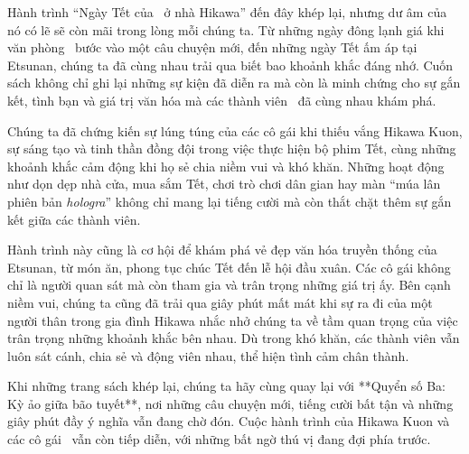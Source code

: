 \documentclass[main.tex]{subfiles}
\begin{document}
\color{black}
Hành trình ``Ngày Tết của \hll\ ở nhà Hikawa'' đến đây khép lại, nhưng dư âm của nó có lẽ sẽ còn mãi trong lòng mỗi chúng ta. Từ những ngày đông lạnh giá khi văn phòng \hll\ bước vào một câu chuyện mới, đến những ngày Tết ấm áp tại Etsunan, chúng ta đã cùng nhau trải qua biết bao khoảnh khắc đáng nhớ. Cuốn sách không chỉ ghi lại những sự kiện đã diễn ra mà còn là minh chứng cho sự gắn kết, tình bạn và giá trị văn hóa mà các thành viên \hll\ đã cùng nhau khám phá.

Chúng ta đã chứng kiến sự lúng túng của các cô gái khi thiếu vắng Hikawa Kuon, sự sáng tạo và tinh thần đồng đội trong việc thực hiện bộ phim Tết, cùng những khoảnh khắc cảm động khi họ sẻ chia niềm vui và khó khăn. Những hoạt động như dọn dẹp nhà cửa, mua sắm Tết, chơi trò chơi dân gian hay màn ``múa lân phiên bản \textit{hologra}'' không chỉ mang lại tiếng cười mà còn thắt chặt thêm sự gắn kết giữa các thành viên.

Hành trình này cũng là cơ hội để khám phá vẻ đẹp văn hóa truyền thống của Etsunan, từ món ăn, phong tục chúc Tết đến lễ hội đầu xuân. Các cô gái không chỉ là người quan sát mà còn tham gia và trân trọng những giá trị ấy. Bên cạnh niềm vui, chúng ta cũng đã trải qua giây phút mất mát khi sự ra đi của một người thân trong gia đình Hikawa nhắc nhở chúng ta về tầm quan trọng của việc trân trọng những khoảnh khắc bên nhau. Dù trong khó khăn, các thành viên vẫn luôn sát cánh, chia sẻ và động viên nhau, thể hiện tình cảm chân thành.

Khi những trang sách khép lại, chúng ta hãy cùng quay lại với **Quyển số Ba: Kỳ ảo giữa bão tuyết**, nơi những câu chuyện mới, tiếng cười bất tận và những giây phút đầy ý nghĩa vẫn đang chờ đón. Cuộc hành trình của Hikawa Kuon và các cô gái \hll\ vẫn còn tiếp diễn, với những bất ngờ thú vị đang đợi phía trước.
\end{document}

